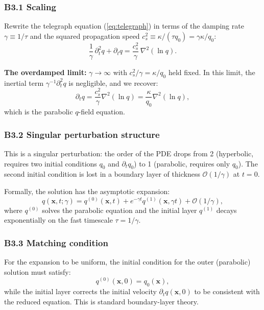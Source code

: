 \documentclass[reprint]{revtex4-2}
\begin{document}
\subsubsection{B3.1 Scaling}

Rewrite the telegraph equation (\ref{eq:telegraph}) in terms of the damping rate $\gamma \equiv 1/\tau$ and the squared propagation speed $c_s^2 \equiv \kappa/(\tau q_0) = \gamma\kappa/q_0$:
\begin{equation}
\frac{1}{\gamma}\,\partial_t^2 q + \partial_t q = \frac{c_s^2}{\gamma}\,\nabla^2(\ln q).
\end{equation}

\textbf{The overdamped limit:} $\gamma \to \infty$ with $c_s^2/\gamma = \kappa/q_0$ held fixed. In this limit, the inertial term $\gamma^{-1}\partial_t^2 q$ is negligible, and we recover:
\begin{equation}
\partial_t q = \frac{c_s^2}{\gamma}\nabla^2(\ln q) = \frac{\kappa}{q_0}\nabla^2(\ln q),
\end{equation}
which is the parabolic $q$-field equation.

\subsubsection{B3.2 Singular perturbation structure}

This is a singular perturbation: the order of the PDE drops from 2 (hyperbolic, requires two initial conditions $q_0$ and $\partial_t q_0$) to 1 (parabolic, requires only $q_0$). The second initial condition is lost in a boundary layer of thickness $\mathcal{O}(1/\gamma)$ at $t=0$.

Formally, the solution has the asymptotic expansion:
\begin{equation}
q(\mathbf{x},t;\gamma) = q^{(0)}(\mathbf{x},t) + e^{-\gamma t}q^{(1)}(\mathbf{x},\gamma t) + \mathcal{O}(1/\gamma),
\end{equation}
where $q^{(0)}$ solves the parabolic equation and the initial layer $q^{(1)}$ decays exponentially on the fast timescale $\tau = 1/\gamma$.

\subsubsection{B3.3 Matching condition}

For the expansion to be uniform, the initial condition for the outer (parabolic) solution must satisfy:
\begin{equation}
q^{(0)}(\mathbf{x},0) = q_0(\mathbf{x}),
\end{equation}
while the initial layer corrects the initial velocity $\partial_t q(\mathbf{x},0)$ to be consistent with the reduced equation. This is standard boundary-layer theory.
\end{document}
